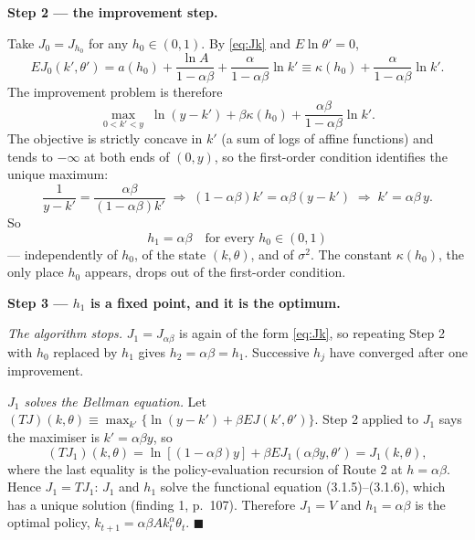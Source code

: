 \documentclass[12pt, letterpaper]{article}
\begin{document}
\begin{tcolorbox}[oddbox,title={Exercise 3.1 \quad Howard's policy iteration algorithm}]
\medskip
\textbf{Step 2 --- the improvement step.}

Take $J_0=J_{h_0}$ for any $h_0\in(0,1)$. By \eqref{eq:Jk} and $E\ln\theta'=0$,
\[
EJ_0(k',\theta')=a(h_0)+\frac{\ln A}{1-\alpha\beta}+\frac{\alpha}{1-\alpha\beta}\ln k'
\equiv \kappa(h_0)+\frac{\alpha}{1-\alpha\beta}\ln k'.
\]
The improvement problem is therefore
\[
\max_{0<k'<y}\;\ln(y-k')+\beta\kappa(h_0)+\frac{\alpha\beta}{1-\alpha\beta}\ln k'.
\]
The objective is strictly concave in $k'$ (a sum of logs of affine functions) and tends to
$-\infty$ at both ends of $(0,y)$, so the first-order condition identifies the unique maximum:
\[
\frac{1}{y-k'}=\frac{\alpha\beta}{(1-\alpha\beta)k'}
\;\Longrightarrow\;(1-\alpha\beta)k'=\alpha\beta(y-k')
\;\Longrightarrow\;k'=\alpha\beta\,y .
\]
So
\[
\boxed{h_1=\alpha\beta\quad\text{for every }h_0\in(0,1)}
\]
--- independently of $h_0$, of the state $(k,\theta)$, and of $\sigma^2$. The constant
$\kappa(h_0)$, the only place $h_0$ appears, drops out of the first-order condition.

\medskip
\textbf{Step 3 --- $h_1$ is a fixed point, and it is the optimum.}

\emph{The algorithm stops.} $J_1=J_{\alpha\beta}$ is again of the form \eqref{eq:Jk}, so
repeating Step 2 with $h_0$ replaced by $h_1$ gives $h_2=\alpha\beta=h_1$. Successive $h_j$
have converged after one improvement.

\emph{$J_1$ solves the Bellman equation.} Let
$(TJ)(k,\theta)\equiv\max_{k'}\{\ln(y-k')+\beta EJ(k',\theta')\}$. Step 2 applied to $J_1$
says the maximiser is $k'=\alpha\beta y$, so
\[
(TJ_1)(k,\theta)=\ln[(1-\alpha\beta)y]+\beta EJ_1(\alpha\beta y,\theta')=J_1(k,\theta),
\]
where the last equality is the policy-evaluation recursion of Route 2 at $h=\alpha\beta$.
Hence $J_1=TJ_1$: $J_1$ and $h_1$ solve the functional equation (3.1.5)--(3.1.6), which has a
unique solution (finding 1, p.~107). Therefore $J_1=V$ and $h_1=\alpha\beta$ is the optimal
policy, $k_{t+1}=\alpha\beta Ak_t^\alpha\theta_t$. \hfill$\blacksquare$


\end{tcolorbox}
\end{document}
